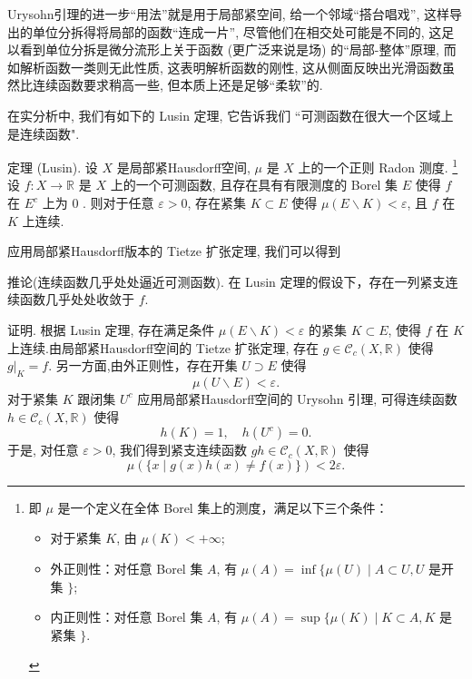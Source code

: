 \documentclass[options]{article}
\begin{document}
Urysohn引理的进一步``用法''就是用于局部紧空间, 给一个邻域``搭台唱戏'', 这样导出的单位分拆得将局部的函数``连成一片'', 尽管他们在相交处可能是不同的,
这足以看到单位分拆是微分流形上关于函数 (更广泛来说是场) 的``局部-整体''原理, 而如解析函数一类则无此性质, 这表明解析函数的刚性,
这从侧面反映出光滑函数虽然比连续函数要求稍高一些, 但本质上还是足够``柔软''的.
\begin{remark}
	在实分析中, 我们有如下的 Lusin 定理, 它告诉我们 “可测函数在很大一个区域上是连续函数".

	\hrulefill

	定理 (Lusin). 设 $X$ 是局部紧Hausdorff空间, $\mu$ 是 $X$ 上的一个正则 Radon 测度. \footnote{即 $\mu$ 是一个定义在全体 Borel 集上的测度，满足以下三个条件：
		\begin{itemize}
			\item 对于紧集 $K$, 由 $\mu(K)<+\infty$;
			\item 外正则性：对任意 Borel 集 $A$, 有 $\mu(A)=\inf \{\mu(U) \mid A \subset U, U$ 是开集 $\}$;
			\item 内正则性：对任意 Borel 集 $A$, 有 $\mu(A)=\sup \{\mu(K) \mid K \subset A, K$ 是紧集 $\}$.
		\end{itemize}
	} 设 $f: X \rightarrow \mathbb{R}$ 是 $X$ 上的一个可测函数, 且存在具有有限测度的 Borel 集 $E$ 使得 $f$ 在 $E^c$ 上为 $0$ . 则对于任意 $\varepsilon>0$, 存在紧集 $K \subset E$ 使得 $\mu(E \backslash K)<\varepsilon$, 且 $f$ 在 $K$ 上连续.
\end{remark}

\begin{remark}
	应用局部紧Hausdorff版本的 Tietze 扩张定理, 我们可以得到

	\hrulefill

	推论(连续函数几乎处处逼近可测函数). 在 Lusin 定理的假设下，存在一列紧支连续函数几乎处处收敛于 $f$.
\end{remark}

证明. 根据 Lusin 定理, 存在满足条件 $\mu(E \backslash K)<\varepsilon$ 的紧集 $K \subset E$, 使得 $f$ 在 $K$ 上连续.由局部紧Hausdorff空间的 Tietze 扩张定理, 存在 $g \in \mathcal{C}_c(X, \mathbb{R})$ 使得 $\left.g\right|_K=f$. 另一方面,由外正则性，存在开集 $U \supset E$ 使得
\[
		\mu(U \backslash E)<\varepsilon .
\]
对于紧集 $K$ 跟闭集 $U^c$ 应用局部紧Hausdorff空间的 Urysohn 引理, 可得连续函数 $h \in \mathcal{C}_c(X, \mathbb{R})$ 使得
\[
		h(K)=1, \quad h\left(U^c\right)=0 .
\]
于是, 对任意 $\varepsilon>0$, 我们得到紧支连续函数 $g h \in \mathcal{C}_c(X, \mathbb{R})$ 使得
\[
		\mu(\{x \mid g(x) h(x) \neq f(x)\})<2 \varepsilon .
\]
\end{document}
